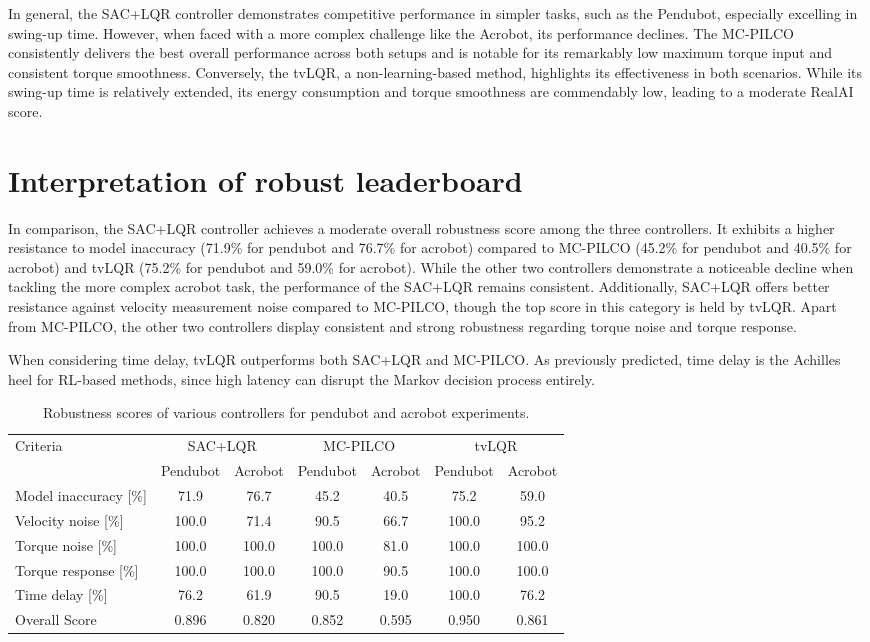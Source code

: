 In general, the SAC+LQR controller demonstrates competitive performance in simpler tasks, such as the Pendubot, especially excelling in swing-up time. However, when faced with a more complex challenge like the Acrobot, its performance declines. The MC-PILCO consistently delivers the best overall performance across both setups and is notable for its remarkably low maximum torque input and consistent torque smoothness. Conversely, the tvLQR, a non-learning-based method, highlights its effectiveness in both scenarios. While its swing-up time is relatively extended, its energy consumption and torque smoothness are commendably low, leading to a moderate RealAI score.

\section{Interpretation of robust leaderboard}
In comparison, the SAC+LQR controller achieves a moderate overall robustness score among the three controllers. It exhibits a higher resistance to model inaccuracy (71.9\% for pendubot and 76.7\% for acrobot) compared to MC-PILCO (45.2\% for pendubot and 40.5\% for acrobot) and tvLQR (75.2\% for pendubot and 59.0\% for acrobot). While the other two controllers demonstrate a noticeable decline when tackling the more complex acrobot task, the performance of the SAC+LQR remains consistent. Additionally, SAC+LQR offers better resistance against velocity measurement noise compared to MC-PILCO, though the top score in this category is held by tvLQR. Apart from MC-PILCO, the other two controllers display consistent and strong robustness regarding torque noise and torque response.

When considering time delay, tvLQR outperforms both SAC+LQR and MC-PILCO. As previously predicted, time delay is the Achilles heel for RL-based methods, since high latency can disrupt the Markov decision process entirely.

\begin{table}[H]
  \centering
 \begin{tabular}{lcccccc}
 \hline
 Criteria & \multicolumn{2}{c}{SAC+LQR} & \multicolumn{2}{c}{MC-PILCO} & \multicolumn{2}{c}{tvLQR} \\
 & Pendubot & Acrobot & Pendubot & Acrobot & Pendubot & Acrobot \\
 \hline
 Model inaccuracy [\%] & 71.9 & 76.7 & 45.2 & 40.5 & 75.2 & 59.0 \\
 Velocity noise [\%] & 100.0 & 71.4 & 90.5 & 66.7 & 100.0 & 95.2 \\
 Torque noise [\%] & 100.0 & 100.0 & 100.0 & 81.0 & 100.0 & 100.0 \\
 Torque response [\%] & 100.0 & 100.0 & 100.0 & 90.5 & 100.0 & 100.0 \\
 Time delay [\%] & 76.2 & 61.9 & 90.5 & 19.0 & 100.0 & 76.2 \\
 Overall Score & 0.896 & 0.820 & 0.852 & 0.595 & 0.950 & 0.861 \\
 \hline
 \end{tabular}
 \caption{Robustness scores of various controllers for pendubot and acrobot experiments.}
 \label{tab:robustness}
\end{table}

